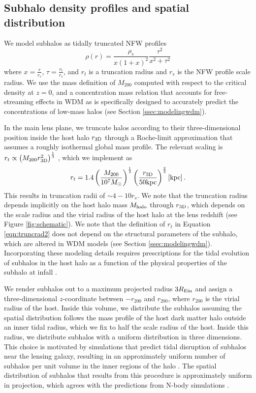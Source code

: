 \subsection{Subhalo density profiles and spatial distribution}
\label{ssec:subhalos}
We model subhalos as tidally truncated NFW profiles \cite{Baltz++09}
\begin{equation}
\label{eqn:massprofile}
\rho \left(r\right) = \frac{\rho_s}{x \left(1+x\right)^2} \frac{\tau^2}{x^2 + \tau^2}
\end{equation}
where $x = \frac{r}{r_s}$, $\tau = \frac{r_t}{r_s}$, and $r_t$ is a truncation radius and $r_s$ is the NFW profile scale radius. We use the mass definition of $M_{200}$ computed with respect to the critical density at $z = 0$, and a concentration mass relation that accounts for free-streaming effects in WDM as is specifically designed to accurately predict the concentrations of low-mass halos (see Section \ref{ssec:modelingwdm}). 

In the main lens plane, we truncate halos according to their three-dimensional position inside the host halo $r_{\rm{3D}}$ through a Roche-limit approximation that assumes a roughly isothermal global mass profile. The relevant scaling is $r_t \propto \left(M_{200} r_{\rm{3D}}^{2}\right)^{\frac{1}{3}}$  \cite{Tormen++98,Cyr-Racine++16}, which we implement as 
\begin{equation} 
\label{eqn:truncrad2}
r_t = 1.4 \left(\frac{M_{200}}{10^7 {M_{\odot}}}\right)^{\frac{1}{3}} \left(\frac{r_{\rm{3D}}}{50 \rm{kpc}}\right)^{\frac{2}{3}} \left[\rm{kpc}\right].
\end{equation}
This results in truncation radii of $\sim 4-10 r_s$. We note that the truncation radius depends implicitly on the host halo mass $M_{\rm{halo}}$ through $r_{\rm{3D}}$, which depends on the scale radius and the virial radius of the host halo at the lens redshift (see Figure \ref{fig:schematic}). We note that the definition of $r_t$ in Equation \ref{eqn:truncrad2} does not depend on the structural parameters of the subhalo, which are altered in WDM models (see Section \ref{ssec:modelingwdm}). Incorporating these modeling details requires prescriptions for the tidal evolution of subhalos in the host halo as a function of the physical properties of the subhalo at infall \cite[e.g.][]{GreenvandenBosch19}.

We render subhalos out to a maximum projected radius $3 R_{\rm{Ein}}$ and assign a three-dimensional $z$-coordinate between $-r_{200}$ and $r_{200}$, where $r_{200}$ is the virial radius of the host. Inside this volume, we distribute the subhalos assuming the spatial distribution follows the mass profile of the host dark matter halo outside an inner tidal radius, which we fix to half the scale radius of the host. Inside this radius, we distribute subhalos with a uniform distribution in three dimensions. This choice is motivated by simulations that predict tidal disruption of subhalos near the lensing galaxy, resulting in an approximately uniform number of subhalos per unit volume in the inner regions of the halo \cite{JiangvdB17}. The spatial distribution of subhalos that results from this procedure is approximately uniform in projection, which agrees with the predictions from N-body simulations \cite{Xu++15}.

